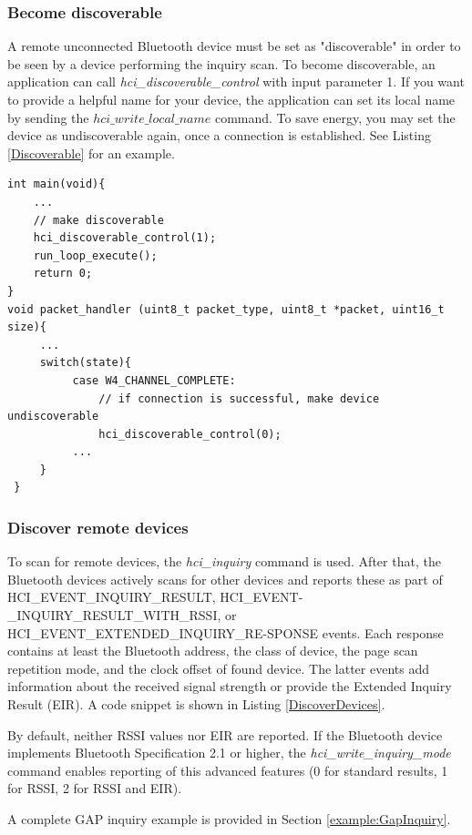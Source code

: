 \subsubsection{Become discoverable}
A remote unconnected Bluetooth device must be set as "discoverable" in order to be seen by a device performing the inquiry scan. To become discoverable, an application can call \emph{hci\_discoverable\_control}  with input parameter 1. If you want to provide a helpful name for your device, the application can set its local name by sending the $hci\_write\_local\_name$ command. To save energy, you may set the device as undiscoverable again, once a connection is established. See Listing \ref{Discoverable} for an example.

\begin{lstlisting}[caption=Setting device as discoverable. OFF by default., label=Discoverable]
int main(void){
    ... 
    // make discoverable
    hci_discoverable_control(1);
    run_loop_execute(); 
    return 0;
}
void packet_handler (uint8_t packet_type, uint8_t *packet, uint16_t size){
     ...
     switch(state){
          case W4_CHANNEL_COMPLETE:
              // if connection is successful, make device undiscoverable
              hci_discoverable_control(0);
          ...
     }
 }
\end{lstlisting}


\subsubsection{Discover remote devices}
\label{section:DiscoverDevices}
To scan for remote devices, the \emph{hci\_inquiry} command is used. After that, the Bluetooth devices actively scans for other devices and reports these as part of HCI\_EVENT\_INQUIRY\_RESULT, HCI\_EVENT-\_INQUIRY\_RESULT\_WITH\_RSSI, or HCI\_EVENT\_EXTENDED\_INQUIRY\_RE-SPONSE events. Each response contains at least the Bluetooth address, the class of device, the page scan repetition mode, and the clock offset of found device. The latter events add information about the received signal strength or provide the Extended Inquiry Result (EIR). A code snippet is shown in Listing \ref{DiscoverDevices}.

By default, neither RSSI values nor EIR are reported. If the Bluetooth device implements Bluetooth Specification 2.1 or higher, the \emph{hci\_write\_inquiry\_mode} command enables reporting of this advanced features (0 for standard results, 1 for RSSI, 2 for RSSI and EIR). 

A complete GAP inquiry example is provided in Section \ref{example:GapInquiry}.

